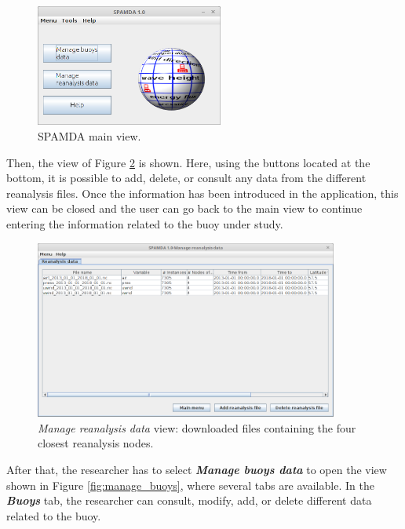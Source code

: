 \documentclass[energies,article,accept,moreauthors,pdftex]{Definitions/mdpi}
\begin{document}
\begin{paracol}{2}
			\begin{figure}[H]
				\includegraphics[width=0.55\textwidth]{figures/FigureMain_view.png}
				\caption{SPAMDA main view.}\label{fig:main_view}
			\end{figure}
			
			Then, the view of Figure  \ref{fig:reanalysis} is shown. Here, using the buttons located at the bottom, it is possible to add, delete, or consult any data from the different reanalysis files. Once the information has been introduced in the application, this view can be closed and the user can go back to the main view to continue entering the information related to the buoy under study. 
\newpage			
\end{paracol}
\nointerlineskip
\begin{figure}[H]
				\widefigure
				\includegraphics[width=0.89\textwidth]{figures/FigureManage_reanalysis_data.png}
				\caption{\textit{Manage reanalysis data} view: downloaded files containing the four closest reanalysis nodes.}\label{fig:reanalysis}
			\end{figure}
\begin{paracol}{2}
\switchcolumn



			
			After that, the researcher has to select \textbf{\textit{Manage buoys data}} to open the view shown in Figure \ref{fig:manage_buoys}, where several tabs are available. In the \textbf{\textit{Buoys}} tab, the researcher can consult, modify, add, or delete different data related to the buoy.
			
					
\end{paracol}
\end{document}
